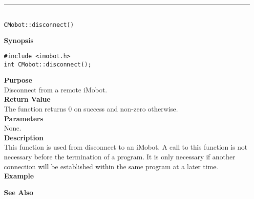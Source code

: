 \noindent
\vspace{5pt}
\rule{4.5in}{0.015in}\\
\noindent
{\LARGE \texttt{CMobot::disconnect()}}\\
{}

\noindent
{\bf Synopsis}\\
\begin{verbatim}
#include <imobot.h>
int CMobot::disconnect();
\end{verbatim}

\noindent
{\bf Purpose}\\
Disconnect from a remote iMobot.\\

\noindent
{\bf Return Value}\\
The function returns 0 on success and non-zero otherwise.\\

\noindent
{\bf Parameters}\\
None.\\

\noindent
{\bf Description}\\
This function is used from disconnect to an iMobot. A call to this function is
not necessary before the termination of a program. It is only necessary if
another connection will be established within the same program at a later time.
\\

\noindent
{\bf Example}\\
\noindent

\noindent
{\bf See Also}\\

